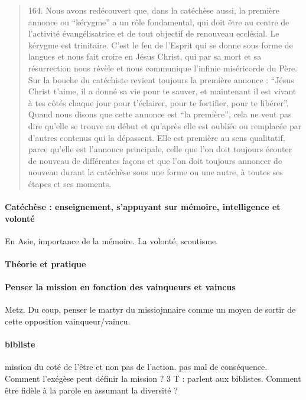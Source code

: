 \begin{quote}
    164. Nous avons redécouvert que, dans la catéchèse aussi, la première annonce ou “kérygme” a un rôle fondamental, qui doit être au centre de l’activité évangélisatrice et de tout objectif de renouveau ecclésial. Le kérygme est trinitaire. C’est le feu de l’Esprit qui se donne sous forme de langues et nous fait croire en Jésus Christ, qui par sa mort et sa résurrection nous révèle et nous communique l’infinie miséricorde du Père. Sur la bouche du catéchiste revient toujours la première annonce : “Jésus Christ t’aime, il a donné sa vie pour te sauver, et maintenant il est vivant à tes côtés chaque jour pour t’éclairer, pour te fortifier, pour te libérer”.
    Quand nous disons que cette annonce est “la première”, cela ne veut pas dire qu’elle se trouve au début et qu’après elle est oubliée ou remplacée par d’autres contenus qui la dépassent. Elle est première au sens qualitatif, parce qu’elle est l’annonce principale, celle que l’on doit toujours écouter de nouveau de différentes façons et que l’on doit toujours annoncer de nouveau durant la catéchèse sous une forme ou une autre, à toutes ses étapes et ses moments.
\end{quote}

\paragraph{Catéchèse : enseignement, s'appuyant sur mémoire, intelligence et volonté} En Asie, importance de la mémoire. La volonté, scoutisme.

\paragraph{Théorie et pratique}
\paragraph{Penser la mission en fonction des vainqueurs et vaincus} Metz. Du coup, penser le martyr du missiojnnaire comme un moyen de sortir de cette opposition vainqueur/vaincu.

\paragraph{bibliste} mission du coté de l'être et non pas de l'action. pas mal de conséquence. Comment l'exégèse peut définir la mission ? 3 T : parlent aux biblistes. Comment être fidèle à la parole en assumant la diversité ?

